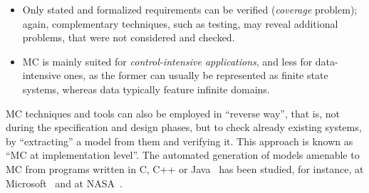 \begin{itemize}
    \item  Only stated and formalized requirements can be verified (\emph{coverage} problem);
	again, complementary techniques, such as testing, may reveal additional problems, that were not considered and checked. 
	\item MC is mainly suited for \emph{control-intensive applications}, and less for data-intensive ones, as the former can usually be represented as finite state systems, whereas data typically feature infinite domains.
\end{itemize}

MC techniques and tools can also be employed in ``reverse way'', that is,
not during the specification and design phases, but
to check already existing systems, by ``extracting'' a model from them and verifying it. 
This approach is known as ``MC at implementation level''.
The automated generation of models amenable to MC from programs
written in C, C++ or Java~\cite{Hatcliff2001,Godefroid:1997} 
has been studied, for instance,
at Microsoft~\cite{Ball2001} and at NASA~\cite{Havelund2000}.

